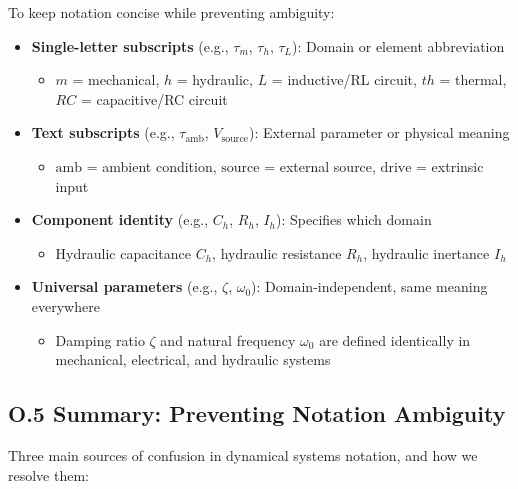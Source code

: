 \documentclass[
]{article}
\providecommand{\tightlist}{%
  \setlength{\itemsep}{0pt}\setlength{\parskip}{0pt}}
\begin{document}
To keep notation concise while preventing ambiguity:

\begin{itemize}
\tightlist
\item
  \textbf{Single-letter subscripts} (e.g., \(\tau_m\), \(\tau_h\),
  \(\tau_L\)): Domain or element abbreviation

  \begin{itemize}
  \tightlist
  \item
    \(m\) = mechanical, \(h\) = hydraulic, \(L\) = inductive/RL circuit,
    \(th\) = thermal, \(RC\) = capacitive/RC circuit
  \end{itemize}
\item
  \textbf{Text subscripts} (e.g., \(\tau_{\text{amb}}\),
  \(V_{\text{source}}\)): External parameter or physical meaning

  \begin{itemize}
  \tightlist
  \item
    \(\text{amb}\) = ambient condition, \(\text{source}\) = external
    source, \(\text{drive}\) = extrinsic input
  \end{itemize}
\item
  \textbf{Component identity} (e.g., \(C_h\), \(R_h\), \(I_h\)):
  Specifies which domain

  \begin{itemize}
  \tightlist
  \item
    Hydraulic capacitance \(C_h\), hydraulic resistance \(R_h\),
    hydraulic inertance \(I_h\)
  \end{itemize}
\item
  \textbf{Universal parameters} (e.g., \(\zeta\), \(\omega_0\)):
  Domain-independent, same meaning everywhere

  \begin{itemize}
  \tightlist
  \item
    Damping ratio \(\zeta\) and natural frequency \(\omega_0\) are
    defined identically in mechanical, electrical, and hydraulic systems
  \end{itemize}
\end{itemize}

\subsection{O.5 Summary: Preventing Notation
Ambiguity}\label{o.5-summary-preventing-notation-ambiguity}

Three main sources of confusion in dynamical systems notation, and how
we resolve them:
\end{document}
